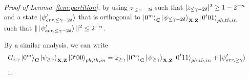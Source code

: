 \begin{proof}[Proof of Lemma~\ref{lem:partition}]
by using $z_{\leq \gamma-2\delta}$ such that $|z_{\leq \gamma-2\delta}|^2\geq 1-2^{-n}$ and a state  $\ket{\psi'_{err,\leq \gamma-2\delta}}$ that is orthogonal to $\ket{0^m}_{\mathbf{C}}\ket{\psi_{\leq\gamma-2\delta}}_{\mathbf{X},\mathbf{Z}}\ket{0^t01}_{ph,th,in}$ such that $\|\ket{\psi'_{err,\leq \gamma-2\delta}}\|^2 \leq 2^{-n}$.

\begin{comment}
$\ket{\psi_{\geq\gamma}}_{\regX,\regZ}$ is a superposition of $\ket{\hat{\alpha}_j}_{\regX,\regZ}$ such that $p_j\geq \gamma$ and $\ket{\hat{\alpha}_j^{11}}_{\regX,\regZ}$.
By Lemma~??? $\ket{\alpha_j}_{\regC,\regX,\regZ}=\ket{0^m}_{\regC}\ot \ket{\hat{\alpha}_j}_{\regX,\regZ}$ can be written as $\ket{\alpha_j}_{\regC,\regX,\regZ}=\frac{1}{\sqrt{2}}(\ket{\phi_j^+}_{\regC,\regX,\regZ}+\ket{\phi_j^-}_{\regC,\regX,\regZ})$ where $\ket{\phi_j^\pm}_{\regC,\regX,\regZ}$ is an eigenvector of $Q$ with eigenvalue $e^{-i\theta_j}$. 
Moreover,  $\ket{\alpha_j^{(11)}}_{\regC,\regX,\regZ}=\ket{0^m}_{\regC}\ot \ket{\hat{\alpha}_j^{(11)}}_{\regX,\regZ}$ is an eigenvector of $Q$ with eigenvalue $1=e^{0}$. 
Thus, after applying $U_{est}$ to  $\ket{\psi_{\geq\gamma}}_{\regX,\regZ}$, $(1-2^{-\secpar})$-fraction of the state contains $\theta$ in the register $ph$ such that $\theta\leq 2\arccos(\sqrt{\gamma}) +2^{-t}$. which implies $\cos^2(\theta/2)\geq \gamma-\delta$ by our choice of $t$.
 Thus, we have $\TD(U_{est}\ket{0^m}_{\regC}\ket{\psi_{\geq\gamma}}_{\regX,\regZ}\ket{0^t00}_{ph,th,in},U_{th}U_{est}\ket{0^m}_{\regC}\ket{\psi_{\geq\gamma}}_{\regX,\regZ}\ket{0^t00}_{ph,th,in})\leq 2^{-n}$ and thus$\TD(\ket{0^m}_{\regC}\ket{\psi_{\geq\gamma}}_{\regX,\regZ}\ket{0^t00}_{ph,th,in},U_{est}^\dag U_{th}U_{est}\ket{0^m}_{\regC}\ket{\psi_{\geq\gamma}}_{\regX,\regZ}\ket{0^t00}_{ph,th,in})\leq 2^{-n}$ where $\TD$ denotes the trace distance. 
 \takashi{The explanation here makes sense? If not, we may need to write some expressions as in the previous manuscript.}

Therefore we can write
\end{comment}

By a similar analysis, we can write 
\begin{align}
 G_{i,\gamma}\ket{0^m}_{\mathbf{C}}\ket{\psi_{\geq\gamma}}_{\mathbf{X},\mathbf{Z}}\ket{0^t00}_{ph,th,in}=z_{\geq \gamma}\ket{0^m}_{\mathbf{C}}\ket{\psi_{\geq\gamma}}_{\mathbf{X},\mathbf{Z}}\ket{0^t11}_{ph,th,in}+\ket{\psi'_{err,\geq \gamma}} \label{eq:geq}
\end{align}


\end{proof}
